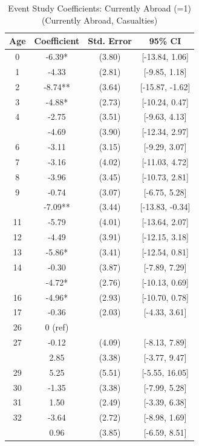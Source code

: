 \begin{table}[!h]
\centering
\caption{\label{tab:event_study_8b_currently_abroad_casualties}Event Study Coefficients: Currently Abroad (=1) (Currently Abroad, Casualties)}
\centering
\fontsize{9}{11}\selectfont
\begin{threeparttable}
\begin{tabular}[t]{cccc}
\toprule
Age & Coefficient & Std. Error & 95\% CI\\
\midrule
0 & -6.39* & (3.80) & {}[-13.84, 1.06]\\
1 & -4.33 & (2.81) & {}[-9.85, 1.18]\\
2 & -8.74** & (3.64) & {}[-15.87, -1.62]\\
3 & -4.88* & (2.73) & {}[-10.24, 0.47]\\
4 & -2.75 & (3.51) & {}[-9.63, 4.13]\\
\addlinespace
5 & -4.69 & (3.90) & {}[-12.34, 2.97]\\
6 & -3.11 & (3.15) & {}[-9.29, 3.07]\\
7 & -3.16 & (4.02) & {}[-11.03, 4.72]\\
8 & -3.96 & (3.45) & {}[-10.73, 2.81]\\
9 & -0.74 & (3.07) & {}[-6.75, 5.28]\\
\addlinespace
10 & -7.09** & (3.44) & {}[-13.83, -0.34]\\
11 & -5.79 & (4.01) & {}[-13.64, 2.07]\\
12 & -4.49 & (3.91) & {}[-12.15, 3.18]\\
13 & -5.86* & (3.41) & {}[-12.54, 0.81]\\
14 & -0.30 & (3.87) & {}[-7.89, 7.29]\\
\addlinespace
15 & -4.72* & (2.76) & {}[-10.13, 0.69]\\
16 & -4.96* & (2.93) & {}[-10.70, 0.78]\\
17 & -0.36 & (2.03) & {}[-4.33, 3.61]\\
26 & 0 (ref) &  & \\
27 & -0.12 & (4.09) & {}[-8.13, 7.89]\\
\addlinespace
28 & 2.85 & (3.38) & {}[-3.77, 9.47]\\
29 & 5.25 & (5.51) & {}[-5.55, 16.05]\\
30 & -1.35 & (3.38) & {}[-7.99, 5.28]\\
31 & 1.50 & (2.49) & {}[-3.39, 6.38]\\
32 & -3.64 & (2.72) & {}[-8.98, 1.69]\\
\addlinespace
33 & 0.96 & (3.85) & {}[-6.59, 8.51]\\

\end{tabular}
\end{threeparttable}
\end{table}

